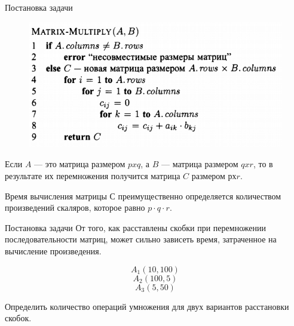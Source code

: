 \documentclass{beamer}
\begin{document}
\begin{frame}[t]{Постановка задачи}
    \begin{figure}[h]
		\centering
		\includegraphics[scale=0.6]{images/lec09-pic13.png}
	\end{figure}
	
	Если $A$ — это матрица размером $p x q$, а $B$ — матрица размером $q x r$, то в результате их перемножения получится матрица $C$ размером $р х r$.

    Время вычисления матрицы $С$ преимущественно определяется количеством произведений скаляров,  которое равно $p\cdot q\cdot r$.
\end{frame}

\begin{frame}[t]{Постановка задачи}
	От того, как расставлены скобки при перемножении последовательности матриц, может сильно зависеть время, затраченное на вычисление произведения.
	
	\[A_1(10, 100)\]
	\[A_2(100, 5)\]
	\[A_3(5, 50)\]
	
	Определить количество операций умножения для двух вариантов расстановки скобок.
\end{frame} 
\end{document}
